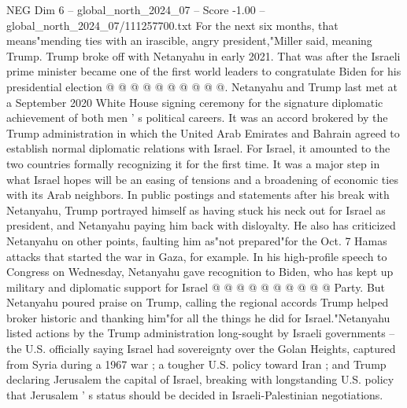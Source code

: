 \begin{textsample}{NEG Dim 6 – global\_north\_2024\_07 – Score -1.00 – global\_north\_2024\_07/111257700.txt}
For the next six months, that means"mending ties with an irascible, angry president,"Miller said, meaning Trump.
Trump broke off with Netanyahu in early 2021.
That was after the Israeli prime minister became one of the first world leaders to congratulate Biden for his presidential election @ @ @ @ @ @ @ @ @ @.
Netanyahu and Trump last met at a September 2020 White House signing ceremony for the signature diplomatic achievement of both men ' s political careers.
It was an accord brokered by the Trump administration in which the United Arab Emirates and Bahrain agreed to establish normal diplomatic relations with Israel.
For Israel, it amounted to the two countries formally recognizing it for the first time.
It was a major step in what Israel hopes will be an easing of tensions and a broadening of economic ties with its Arab neighbors.
In public postings and statements after his break with Netanyahu, Trump portrayed himself as having stuck his neck out for Israel as president, and Netanyahu paying him back with disloyalty.
He also has criticized Netanyahu on other points, faulting him as"not prepared"for the Oct. 7 Hamas attacks that started the war in Gaza, for example.
In his high-profile speech to Congress on Wednesday, Netanyahu gave recognition to Biden, who has kept up military and diplomatic support for Israel @ @ @ @ @ @ @ @ @ @ Party.
But Netanyahu poured praise on Trump, calling the regional accords Trump helped broker historic and thanking him"for all the things he did for Israel."Netanyahu listed actions by the Trump administration long-sought by Israeli governments -- the U.S. officially saying Israel had sovereignty over the Golan Heights, captured from Syria during a 1967 war ; a tougher U.S. policy toward Iran ; and Trump declaring Jerusalem the capital of Israel, breaking with longstanding U.S. policy that Jerusalem ' s status should be decided in Israeli-Palestinian negotiations.

\end{textsample}
